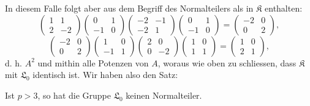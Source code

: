 \documentclass[11pt]{article}
\providecommand{\Lzero}{\mathfrak L_0}
\providecommand{\Kgrp}{\mathfrak K}
\begin{document}
In diesem Falle folgt aber aus dem Begriff des Normalteilers als in $\Kgrp$ enthalten:
\[
\begin{pmatrix}1&1\\2&-2\end{pmatrix}
\begin{pmatrix}0&1\\-1&0\end{pmatrix}
\begin{pmatrix}-2&-1\\-2&1\end{pmatrix}
\begin{pmatrix}0&1\\-1&0\end{pmatrix}
=\begin{pmatrix}-2&0\\0&2\end{pmatrix},
\]
\[
\begin{pmatrix}-2&0\\0&2\end{pmatrix}
\begin{pmatrix}1&0\\-1&1\end{pmatrix}
\begin{pmatrix}2&0\\0&-2\end{pmatrix}
\begin{pmatrix}1&0\\1&1\end{pmatrix}
=\begin{pmatrix}1&0\\2&1\end{pmatrix},
\]
d. h. $A^2$ und mithin alle Potenzen von $A$, woraus wie oben zu schliessen, dass $\Kgrp$ mit $\Lzero$ identisch ist. Wir haben also den Satz:

Ist $p>3$, so hat die Gruppe $\Lzero$ keinen Normalteiler.
\end{document}

